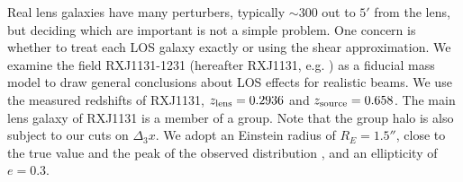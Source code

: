 Real lens galaxies have many perturbers, typically $\sim 300$ out to $5'$ from the lens, but deciding which are important is not a simple problem. One concern is whether to treat each LOS galaxy exactly or using the shear approximation. We examine the field RXJ1131-1231 (hereafter RXJ1131, e.g. \citealt{Suyu13}) as a fiducial mass model to draw general conclusions about LOS effects for realistic beams. We use the measured redshifts of RXJ1131, $z_{\rm{lens}} = 0.2936$ and $z_{\rm{source}} = 0.658$.  The main lens galaxy of RXJ1131 is a member of a group. Note that the group halo is also subject to our cuts on $\Delta_3 x$. We adopt an Einstein radius of $R_E = 1.5''$, close to the true value \citep{Suyu13} and the peak of the observed distribution \citep{Sonnenfeld13}, and an ellipticity of $e=0.3$.
  
  
  
  